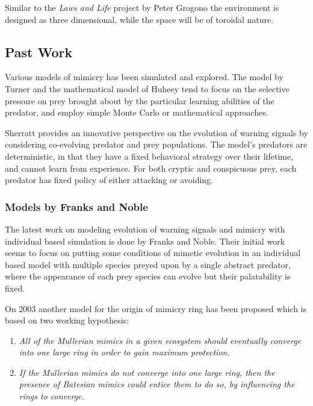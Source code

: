 \documentclass[letterpaper]{article}
\numberwithin{equation}{section}
\begin{document}
Similar to the \textsl{Laws and Life} project by Peter Grogono \citep{grogono2003} the environment is designed as three dimensional, while the space will be of toroidal nature.

\subsection{Past Work}
Various models of mimicry has been simulated and explored. The model by Turner \citep{turner1996} and the mathematical model of Huheey \citep{huheey1988} tend to focus on the selective pressure on prey brought about by the particular learning abilities of the predator, and employ simple Monte Carlo or mathematical approaches.

Sherratt \citep{sherratt2002} provides an innovative perspective on the evolution of warning signals by considering co-evolving predator and prey populations. The model's predators are deterministic, in that they have a fixed behavioral strategy over their lifetime, and cannot learn from experience. For both cryptic and conspicuous prey, each predator has fixed policy of either attacking or avoiding.

\subsubsection{Models by Franks and Noble}
\label{subsubsec:models-by-frank-and-noble}
The latest work on modeling evolution of warning signals and mimicry with individual based simulation is done by Franks and Noble. Their initial work \citep{franks2002} seems to focus on putting some conditions of mimetic evolution in an individual based model with multiple species preyed upon by a single abstract predator, where the appearance of each prey species can evolve but their palatability is fixed.

On 2003 \citep{franks2003} another model for the origin of mimicry ring has been proposed which is based on two working hypothesis:

\begin{enumerate}
	\item \textsl{All of the Mullerian mimics in a given ecosystem should eventually converge into one large ring in order to gain maximum protection.}
	\item \textsl{If the Mullerian mimics do not converge into one large ring, then the presence of Batesian mimics could entice them to do so, by influencing the rings to converge.}
\end{enumerate}
\end{document}
